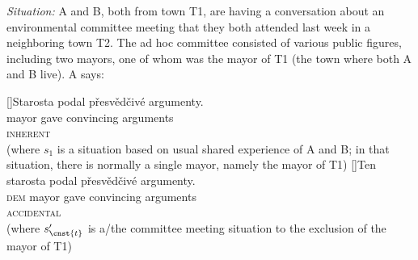 \documentclass[output=paper,colorlinks,citecolor=brown,newtxmath]{langscibook}
\begin{document}
\eanoraggedright \textit{Situation:} A and B, both from town T1, are having a conversation about an environmental committee meeting that they both attended last week in a neighboring town T2. The ad hoc committee consisted of various public figures, including two mayors, one of whom was the mayor of T1 (the town where both A and B live). A says:\label{simik:ex:mayor}
\begin{xlist}
[]{\gll Starosta podal přesvědčivé argumenty.\\
mayor gave convincing arguments\\\hfill\textsc{inherent}
\smallskip
\z
{}\\\smallskip
(where $s_1$ is a situation based on usual shared experience of A and B; in that situation, there is normally a single mayor, namely the mayor of T1)}
[]{\gll Ten starosta podal přesvědčivé argumenty.\\
\textsc{dem} mayor gave convincing arguments\\\hfill\textsc{accidental}
\smallskip
\z
{}\\\smallskip
(where $s'_{\cnst{t}}$ is a/the committee meeting situation to the exclusion of the mayor of T1)}
\end{xlist}
\z
\end{document}
